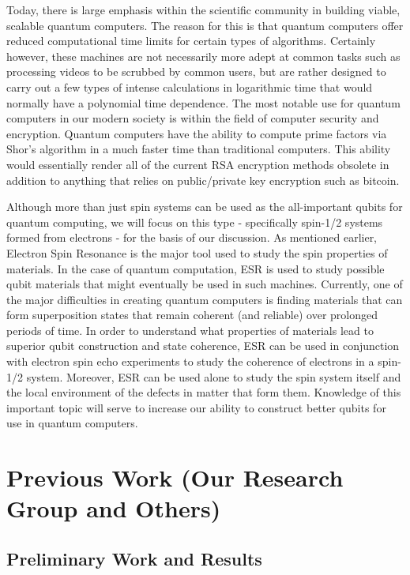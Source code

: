\documentclass[oneside, astronomy, noacknowlegments]{BYUPhys}
\begin{document}
Today, there is large emphasis within the scientific community in building viable, scalable quantum computers. The reason for this is that quantum computers offer reduced computational time limits for certain types of algorithms. Certainly however, these machines are not necessarily more adept at common tasks such as processing videos to be scrubbed by common users, but are rather designed to carry out a few types of intense calculations in logarithmic time that would normally have a polynomial time dependence. The most notable use for quantum computers in our modern society is within the field of computer security and encryption. Quantum computers have the ability to compute prime factors via Shor's algorithm in a much faster time than traditional computers. This ability would essentially render all of the current RSA encryption methods obsolete in addition to anything that relies on public/private key encryption such as bitcoin.

Although more than just spin systems can be used as the all-important qubits for quantum computing, we will focus on this type - specifically spin-1/2 systems formed from electrons - for the basis of our discussion. As mentioned earlier, Electron Spin Resonance is the major tool used to study the spin properties of materials. In the case of quantum computation, ESR is used to study possible qubit materials that might eventually be used in such machines. Currently, one of the major difficulties in creating quantum computers is finding materials that can form superposition states that remain coherent (and reliable) over prolonged periods of time. In order to understand what properties of materials lead to superior qubit construction and state coherence, ESR can be used in conjunction with electron spin echo experiments to study the coherence of electrons in a spin-1/2 system. Moreover, ESR can be used alone to study the spin system itself and the local environment of the defects in matter that form them. Knowledge of this important topic will serve to increase our ability to construct better qubits for use in quantum computers.

\section{Previous Work (Our Research Group and Others)}

\subsection{Preliminary Work and Results}
\end{document}
